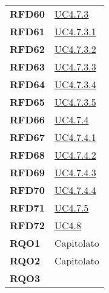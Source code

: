 \begin{longtable}[H]{>{\centering\bfseries}m{8cm} >{\centering\arraybackslash}m{8cm}}
    RFD60
  
    &   \hyperref[par:uc4.7.3]{UC4.7.3} \\

    RFD61
    
    &   \hyperref[spar:uc4.7.3.1]{UC4.7.3.1} \\

    RFD62
  
    &   \hyperref[spar:uc4.7.3.2]{UC4.7.3.2} \\

    RFD63
  
    &   \hyperref[spar:uc4.7.3.3]{UC4.7.3.3} \\

    RFD64

    &   \hyperref[spar:uc4.7.3.4]{UC4.7.3.4} \\

    RFD65
  
    &   \hyperref[spar:uc4.7.3.5]{UC4.7.3.5} \\

    RFD66
   
    &   \hyperref[par:uc4.7.4]{UC4.7.4} \\

    RFD67

    &   \hyperref[spar:uc4.7.4.1]{UC4.7.4.1} \\


    RFD68

    &   \hyperref[spar:uc4.7.4.2]{UC4.7.4.2} \\

    RFD69
 
    &   \hyperref[spar:uc4.7.4.3]{UC4.7.4.3} \\

    RFD70

    &   \hyperref[spar:uc4.7.4.4]{UC4.7.4.4} \\

    RFD71

    &   \hyperref[par:uc4.7.5]{UC4.7.5} \\

    RFD72
    &   \hyperref[ssub:uc4.8]{UC4.8} \\

    RQO1
    & Capitolato \\

    RQO2

    & Capitolato \\

    RQO3


\end{longtable}

